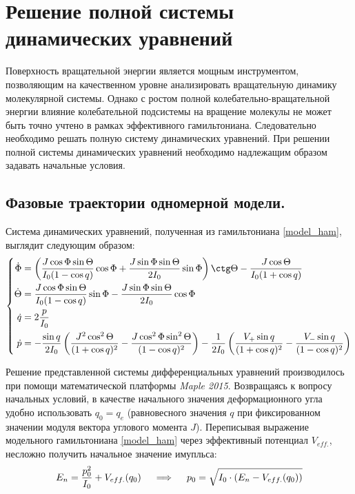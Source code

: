 \section{Решение полной системы динамических уравнений}
Поверхность вращательной энергии является мощным инструментом, позволяющим на качественном уровне анализировать вращательную динамику молекулярной системы. Однако с ростом полной колебательно-вращательной энергии влияние колебательной подсистемы на вращение молекулы не может быть точно учтено в рамках эффективного гамильтониана. Следовательно необходимо решать полную систему динамических уравнений. При решении полной системы динамических уравнений необходимо надлежащим образом задавать начальные условия.

\subsection{Фазовые траектории одномерной модели.}

Система динамических уравнений, полученная из гамильтониана \eqref{model_ham}, выглядит следующим образом:
\vverh
\begin{gather}
\left\{
\begin{aligned}
\dot{\Phi} &= \left( \frac{J \cos \Phi \sin \Theta}{I_0 ( 1 - \cos q)} \cos \Phi + \frac{J \sin \Phi \sin \Theta}{2I_0} \sin \Phi \right) \ctg \Theta - \frac{J \cos \Theta}{I_0 (1 + \cos q)} \\
\dot{\Theta} &= \frac{J \cos \Phi \sin \Theta}{I_0 (1 - \cos q)} \sin \Phi - \frac{J \sin \Phi \sin \Theta}{2I_0} \cos \Phi \\
\dot{q} &= 2	\frac{p}{I_0} \\
\dot{p} &= - \frac{\sin q}{2I_0} \left( \frac{J^2 \cos^2 \Theta}{(1 + \cos q)^2} - \frac{J \cos^2 \Phi \sin^2 \Theta}{(1 - \cos q)^2} \right) - \frac{1}{2I_0} \left( \frac{V_{+} \sin q}{(1 + \cos q)^2} - \frac{V_{-} \sin q}{(1 - \cos q)^2} \right)
\end{aligned}
\right. \notag
\end{gather}

Решение представленной системы дифференциальных уравнений производилось при помощи математической платформы \textit{Maple 2015}. Возвращаясь к вопросу начальных условий, в качестве начального значения деформационного угла удобно использовать $q_0 = q_e$ (равновесного значения $q$ при фиксированном значении модуля вектора углового момента $J$). Переписывая выражение модельного гамильтониана \eqref{model_ham} через эффективный потенциал $V_{eff.}$, несложно получить начальное значение имупльса:
\vverh
\begin{gather}
E_n = \frac{p_0^2}{I_0} + V_{eff.} (q_0) \quad \implies \quad p_0 = \sqrt{I_0 \cdot \left( E_n - V_{eff.} (q_0) \right) } \notag
\end{gather}

